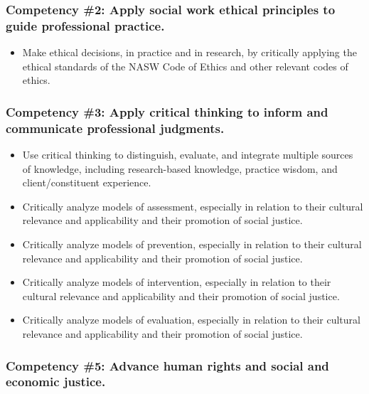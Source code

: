 \documentclass[11pt,]{article}
\providecommand{\tightlist}{%
  \setlength{\itemsep}{0pt}\setlength{\parskip}{0pt}}
\begin{document}
\subsubsection{Competency \#2: Apply social work ethical principles to
guide professional
practice.}\label{competency-2-apply-social-work-ethical-principles-to-guide-professional-practice.}

\begin{itemize}
\tightlist
\item
  Make ethical decisions, in practice and in research, by critically
  applying the ethical standards of the NASW Code of Ethics and other
  relevant codes of ethics.
\end{itemize}

\subsubsection{Competency \#3: Apply critical thinking to inform and
communicate professional
judgments.}\label{competency-3-apply-critical-thinking-to-inform-and-communicate-professional-judgments.}

\begin{itemize}
\tightlist
\item
  Use critical thinking to distinguish, evaluate, and integrate multiple
  sources of knowledge, including research-based knowledge, practice
  wisdom, and client/constituent experience.
\item
  Critically analyze models of assessment, especially in relation to
  their cultural relevance and applicability and their promotion of
  social justice.
\item
  Critically analyze models of prevention, especially in relation to
  their cultural relevance and applicability and their promotion of
  social justice.
\item
  Critically analyze models of intervention, especially in relation to
  their cultural relevance and applicability and their promotion of
  social justice.
\item
  Critically analyze models of evaluation, especially in relation to
  their cultural relevance and applicability and their promotion of
  social justice.
\end{itemize}

\subsubsection{Competency \#5: Advance human rights and social and
economic
justice.}\label{competency-5-advance-human-rights-and-social-and-economic-justice.}
\end{document}
